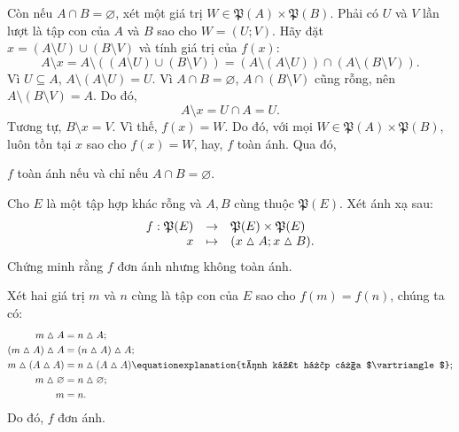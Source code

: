 Còn nếu $A \cap B = \varnothing$, xét một giá trị $W \in \mathfrak{P}(A) \times \mathfrak{P}(B)$. Phải có $U$ và $V$ lần lượt là tập con của $A$ và $B$ sao cho $W = (U; V)$. Hãy đặt $x = (A \setminus U) \cup (B \setminus V)$ và tính giá trị của $f(x)$:
\begin{equation*}
   A \setminus x = A \setminus ((A \setminus U) \cup (B \setminus V)) = (A \setminus (A \setminus U)) \cap (A \setminus (B \setminus V)).
\end{equation*}
Vì $U \subseteq A$, $A \setminus (A \setminus U) = U$. Vì $A \cap B = \varnothing$, $A \cap (B \setminus V)$ cũng rỗng, nên $A \setminus (B \setminus V) = A$. Do đó, \begin{equation*}
   A \setminus x = U \cap A = U.
\end{equation*}
Tương tự, $B \setminus x = V$. Vì thế, $f(x) = W$. Do đó, với mọi $W \in \mathfrak{P}(A) \times \mathfrak{P}(B)$, luôn tồn tại $x$ sao cho $f(x) = W$, hay, $f$ toàn ánh. Qua đó, \begin{center}
   $f$ toàn ánh nếu và chỉ nếu $A \cap B = \varnothing$.
\end{center}

\exercise Cho $E$ là một tập hợp khác rỗng và $A, B$ cùng thuộc $\mathfrak{P}(E)$. Xét ánh xạ sau:
\begin{equation*}
   \begin{array}[t]{rcl}
      f: \mathfrak{P}(E) & \to & \mathfrak{P}(E) \times \mathfrak{P}(E) \\
      x &\mapsto &(x \vartriangle A; x \vartriangle B).
   \end{array}
\end{equation*}
Chứng minh rằng $f$ đơn ánh nhưng không toàn ánh.

\solution

Xét hai giá trị $m$ và $n$ cùng là tập con của $E$ sao cho $f(m) = f(n)$, chúng ta có:
\begin{align*}
   m \vartriangle A &= n \vartriangle A; \\
   (m \vartriangle A) \vartriangle A &= (n \vartriangle A) \vartriangle A; \\
   m \vartriangle (A \vartriangle A) &= n \vartriangle (A \vartriangle A) \equationexplanation{tính kết hợp của $\vartriangle$}; \\
   m \vartriangle \varnothing &= n \vartriangle \varnothing; \\
   m &= n.
\end{align*}
Do đó, $f$ đơn ánh.

